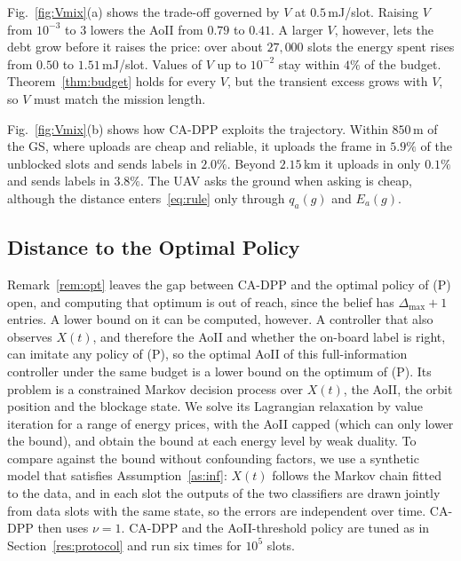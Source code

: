 \documentclass[5p,twocolumn]{elsarticle}
\theoremstyle{remark}
\begin{document}
Fig.~\ref{fig:Vmix}(a) shows the trade-off governed by $V$ at $0.5$\,mJ/slot. Raising $V$ from $10^{-3}$ to $3$ lowers the AoII from $0.79$ to $0.41$. A larger $V$, however, lets the debt grow before it raises the price: over about $27{,}000$ slots the energy spent rises from $0.50$ to $1.51$\,mJ/slot. Values of $V$ up to $10^{-2}$ stay within $4\%$ of the budget. Theorem~\ref{thm:budget} holds for every $V$, but the transient excess grows with $V$, so $V$ must match the mission length.

Fig.~\ref{fig:Vmix}(b) shows how CA-DPP exploits the trajectory. Within $850$\,m of the GS, where uploads are cheap and reliable, it uploads the frame in $5.9\%$ of the unblocked slots and sends labels in $2.0\%$. Beyond $2.15$\,km it uploads in only $0.1\%$ and sends labels in $3.8\%$. The UAV asks the ground when asking is cheap, although the distance enters~\eqref{eq:rule} only through $q_a(g)$ and $E_a(g)$.
\subsection{Distance to the Optimal Policy}\label{res:opt}
Remark~\ref{rem:opt} leaves the gap between CA-DPP and the optimal policy of (P) open, and computing that optimum is out of reach, since the belief has $\Delta_{\max}+1$ entries. A lower bound on it can be computed, however. A controller that also observes $X(t)$, and therefore the AoII and whether the on-board label is right, can imitate any policy of (P), so the optimal AoII of this full-information controller under the same budget is a lower bound on the optimum of (P). Its problem is a constrained Markov decision process over $X(t)$, the AoII, the orbit position and the blockage state. We solve its Lagrangian relaxation by value iteration for a range of energy prices, with the AoII capped (which can only lower the bound), and obtain the bound at each energy level by weak duality. To compare against the bound without confounding factors, we use a synthetic model that satisfies Assumption~\ref{as:inf}: $X(t)$ follows the Markov chain fitted to the data, and in each slot the outputs of the two classifiers are drawn jointly from data slots with the same state, so the errors are independent over time. CA-DPP then uses $\nu=1$. CA-DPP and the AoII-threshold policy are tuned as in Section~\ref{res:protocol} and run six times for $10^5$ slots.
\end{document}
